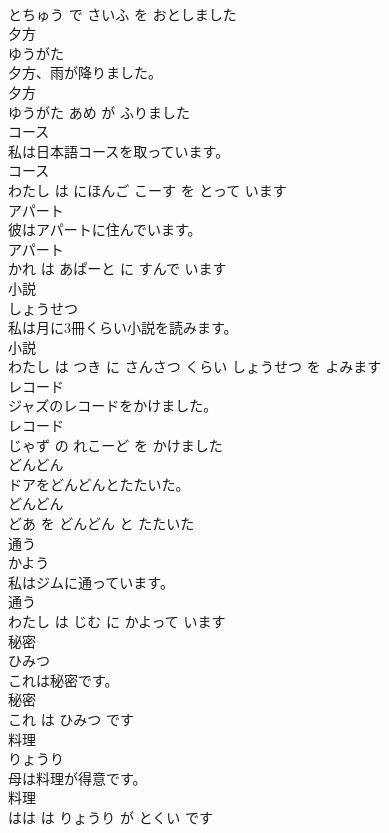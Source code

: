 \documentclass[8pt]{extreport}
\begin{document}
\begin{CJK}{UTF8}{min}
\\	とちゅう で さいふ を おとしました			
\\	夕方	
\\	ゆうがた			
\\	夕方、雨が降りました。	
\\	夕方 
\\	ゆうがた あめ が ふりました			
\\	コース	
\\	私は日本語コースを取っています。	
\\	コース 
\\	わたし は にほんご こーす を とって います			
\\	アパート	
\\	彼はアパートに住んでいます。	
\\	アパート 
\\	かれ は あぱーと に すんで います			
\\	小説	
\\	しょうせつ			
\\	私は月に3冊くらい小説を読みます。	
\\	小説 
\\	わたし は つき に さんさつ くらい しょうせつ を よみます			
\\	レコード	
\\	ジャズのレコードをかけました。	
\\	レコード 
\\	じゃず の れこーど を かけました			
\\	どんどん	
\\	ドアをどんどんとたたいた。	
\\	どんどん 
\\	どあ を どんどん と たたいた			
\\	通う	
\\	かよう			
\\	私はジムに通っています。	
\\	通う 
\\	わたし は じむ に かよって います			
\\	秘密	
\\	ひみつ			
\\	これは秘密です。	
\\	秘密 
\\	これ は ひみつ です			
\\	料理	
\\	りょうり			
\\	母は料理が得意です。	
\\	料理 
\\	はは は りょうり が とくい です			

\end{CJK}
\end{document}
